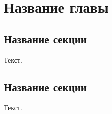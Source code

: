 
\chapter{Название главы}
\label{app2}

\section{Название секции}
\label{app1:sec1}

Текст.

\section{Название секции}
\label{app2:sec2}

Текст.

